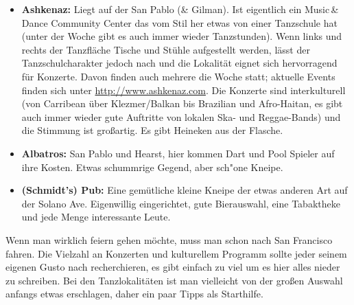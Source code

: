 \documentclass[a4paper]{scrreprt}
\begin{document}
\begin{itemize}
  \item \textbf{Ashkenaz:} Liegt auf der San Pablo (\& Gilman). Ist eigentlich ein Music\,\&\,Dance Community Center das vom Stil her etwas von einer Tanzschule hat (unter der Woche gibt es auch immer wieder Tanzstunden). Wenn links und rechts der Tanzfläche Tische und Stühle aufgestellt werden, lässt der Tanzschulcharakter jedoch nach und die Lokalität eignet sich hervorragend für Konzerte. Davon finden auch mehrere die Woche statt; aktuelle Events finden sich unter \url{http://www.ashkenaz.com}. Die Konzerte sind interkulturell (von Carribean über Klezmer/Balkan bis Brazilian und Afro-Haitan, es gibt auch immer wieder gute Auftritte von lokalen Ska- und Reggae-Bands) und die Stimmung ist großartig. Es gibt Heineken aus der Flasche.
  
  \item \textbf{Albatros:} San Pablo und Hearst, hier kommen Dart und Pool Spieler auf ihre Kosten. Etwas schummrige Gegend, aber sch"one Kneipe.

	\item \textbf{(Schmidt's) Pub:} Eine gemütliche kleine Kneipe der etwas anderen Art auf der Solano Ave. Eigenwillig eingerichtet, gute Bierauswahl, eine Tabaktheke und jede Menge interessante Leute. 

\end{itemize}
  
Wenn man wirklich feiern gehen möchte, muss man schon nach San Francisco fahren. Die Vielzahl an Konzerten und kulturellem Programm sollte jeder seinem eigenen Gusto nach recherchieren, es gibt einfach zu viel um es hier alles nieder zu schreiben.
Bei den Tanzlokalitäten ist man vielleicht von der großen Auswahl anfangs etwas erschlagen, daher ein paar Tipps als Starthilfe.
\end{document}
